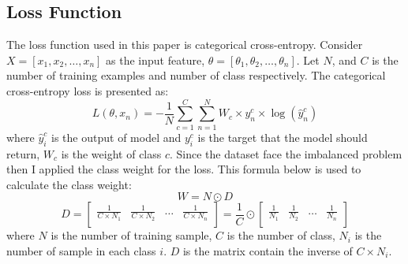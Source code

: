 \documentclass[sensors,article,submit,pdftex,moreauthors]{Definitions/mdpi}
\begin{document}
\subsection{Loss Function}
The loss function used in this paper is categorical cross-entropy. Consider $X = [x_1, x_2, \dots, x_n]$ as the input feature, $\theta = [\theta_1, \theta_2, \dots, \theta_n]$. Let $N$, and $C$ is the number of training examples and number of class respectively. The categorical cross-entropy loss is presented as:
\[L(\theta, x_n) = -\frac{1}{N}\sum_{c=1}^{C}\sum_{n=1}^{N}W_c\times y^c_n \times \log(\hat{y}^c_n)\]
where $\hat{y}^c_i$  is the output of model and $y^c_i$ is the target that the model should return, $W_c$ is the weight of class $c$. Since the dataset face the imbalanced problem then I applied the class weight for the loss. This formula below is used to calculate the class weight:
\[W = N \odot D\]
\[D = \begin{bmatrix}
	\frac{1}{C \times  N_1} & \frac{1}{C \times  N_2} & \dots & \frac{1}{C \times  N_n}\\
\end{bmatrix} = \frac{1}{C} \odot \begin{bmatrix}
	\frac{1}{N_1} & \frac{1}{N_2} & \dots & \frac{1}{N_n}\\
\end{bmatrix}\]
where $N$ is the number of training sample, $C$ is the number of class, $N_i$ is the number of sample in each class $i$. $D$ is the matrix contain the inverse of $C \times N_i$. 
\end{document}
